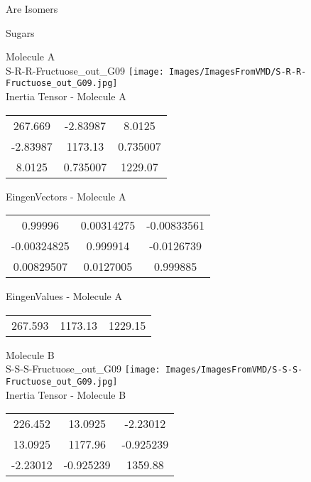 \begin{center}
\vtab
\vtab
\textcolor{NavyBlue}{\Large Are Isomers}
\end{center}
\newpage

\vtab[-2cm]
\begin{center}
{\large Sugars}
\end{center}
\begin{multicols}{2}
\begin{center}
Molecule A \\ 
S-R-R-Fructuose\_out\_G09
\texttt{[image: Images/ImagesFromVMD/S-R-R-Fructuose\_out\_G09.jpg]}
\\
Inertia Tensor - Molecule A \\
\vtab
\begin{tabular}{|c c c|}
267.669	 & 	-2.83987	 & 	8.0125	 \\
-2.83987	 & 	1173.13	 & 	0.735007	 \\
8.0125	 & 	0.735007	 & 	1229.07
\end{tabular}

\vtab
 EingenVectors - Molecule A     \\
\vtab
\begin{tabular}{|c c c|}
0.99996	 & 	0.00314275	 & 	-0.00833561	 \\
-0.00324825	 & 	0.999914	 & 	-0.0126739	 \\
0.00829507	 & 	0.0127005	 & 	0.999885
\end{tabular}

\vtab
 EingenValues - Molecule A     \\
\vtab
\begin{tabular}{|c c c|}
267.593	 & 	1173.13	 & 	1229.15
\end{tabular}
\columnbreak

Molecule B \\ 
S-S-S-Fructuose\_out\_G09
\texttt{[image: Images/ImagesFromVMD/S-S-S-Fructuose\_out\_G09.jpg]}
\\
Inertia Tensor - Molecule B \\
\vtab
\begin{tabular}{|c c c|}
226.452	 & 	13.0925	 & 	-2.23012	 \\
13.0925	 & 	1177.96	 & 	-0.925239	 \\
-2.23012	 & 	-0.925239	 & 	1359.88
\end{tabular}


\end{center}
\end{multicols}
